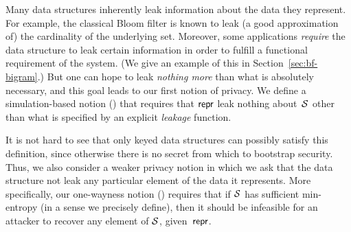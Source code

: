 %
Many data structures inherently leak information about the data they represent.
For example, the classical Bloom filter is known to leak (a good approximation
of) the cardinality of the underlying set. Moreover, some applications
\emph{require} the data structure to leak certain information in order to
fulfill a functional requirement of the system. (We give an example of this in
Section~\ref{sec:bf-bigram}.)
%
%
But one can hope to leak \emph{nothing more} than what is absolutely
necessary, and
this goal leads to our first notion of privacy.
We define a simulation-based notion (\ssrep) that requires that $\mathsf{repr}$ leak
nothing about~$\mathcal{S}$ other than what is specified by an explicit \emph{leakage}
function.

It is not hard to see that only keyed data structures can possibly satisfy this
definition, since otherwise there is no secret from which to bootstrap security.
Thus, we also consider a weaker privacy notion in which we ask that the data
structure not leak any particular element of the data it represents. More
specifically, our one-wayness notion (\owrep) requires that if $\mathcal{S}$ has
sufficient min-entropy (in a sense we precisely define), then it should be
infeasible for an attacker to recover any element of $\mathcal{S}$, given~$\mathsf{repr}$.

\fi

